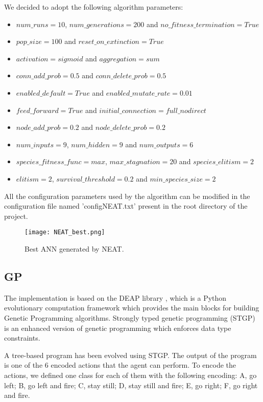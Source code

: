 We decided to adopt the following algorithm parameters:
\begin{itemize}
    \item $num\_runs = 10$, $num\_generations = 200$ and $no\_fitness\_termination = True$
    \item $pop\_size = 100$ and $reset\_on\_extinction = True$
    \item $activation = sigmoid$ and $aggregation = sum$
    \item $conn\_add\_prob = 0.5$ and $conn\_delete\_prob = 0.5$
    \item $enabled\_default = True$ and $enabled\_mutate\_rate = 0.01$
    \item $feed\_forward = True$ and $initial\_connection = full\_nodirect$
    \item $node\_add\_prob = 0.2$ and $node\_delete\_prob = 0.2$
    \item $num\_inputs = 9$, $num\_hidden = 9$ and $num\_outputs = 6$
    \item $species\_fitness\_func = max$, $max\_stagnation = 20$ and $species\_elitism = 2$
    \item $elitism = 2$, $survival\_threshold = 0.2$ and $min\_species\_size = 2$
\end{itemize}

All the configuration parameters used by the algorithm can be modified in the configuration
file named 'configNEAT.txt' present in the root directory of the project.


\begin{figure*}[htbp]
\centerline{\texttt{[image: NEAT\_best.png]}}
\caption{Best ANN generated by NEAT.}
\label{fig:NEAT_best}
\end{figure*}


\subsection{GP}
The implementation is based on the DEAP library \cite{DEAP}, which is a Python evolutionary
computation framework which provides the main blocks for building Genetic Programming
algorithms. Strongly typed genetic programming (STGP) is an enhanced version of genetic
programming which enforces data type constraints.

A tree-based program has been evolved using STGP. The output of the program is one of
the 6 encoded actions that the agent can perform. To encode the actions, we defined one
class for each of them with the following encoding:
A, go left; B, go left and fire; C, stay still; D, stay still and fire; E, go right; F, go right and fire.

